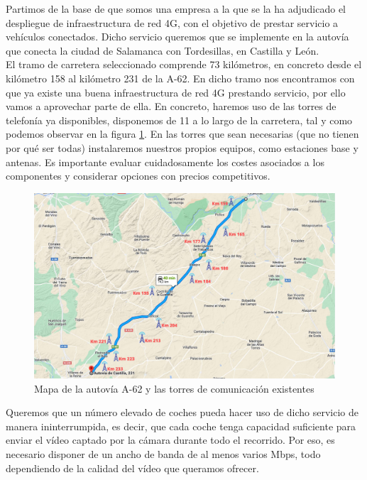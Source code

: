 Partimos de la base de que somos una empresa a la que se la ha adjudicado el despliegue de infraestructura de red 4G, con el objetivo de prestar servicio a vehículos conectados. Dicho servicio queremos que se implemente en la autovía que conecta la ciudad de Salamanca con Tordesillas, en Castilla y León. \\

El tramo de carretera seleccionado comprende 73 kilómetros, en concreto desde el kilómetro 158 al kilómetro 231 de la A-62. En dicho tramo nos encontramos con que ya existe una buena infraestructura de red 4G prestando servicio, por ello vamos a aprovechar parte de ella. En concreto, haremos uso de las torres de telefonía ya disponibles, disponemos de 11 a lo largo de la carretera, tal y como podemos observar en la figura \ref{autovia}. En las torres que sean necesarias (que no tienen por qué ser todas) instalaremos nuestros propios equipos, como estaciones base y antenas. Es importante evaluar cuidadosamente los costes asociados a los componentes y considerar opciones con precios competitivos. \\


\begin{figure}[H]
    \centering
 	\includegraphics[width=\textwidth]{Imagenes/PlanteamientoInicial/torres_telefonia.pdf}
    \caption{Mapa de la autovía A-62 y las torres de comunicación existentes }
    \label{autovia}
\end{figure}

Queremos que un número elevado de coches pueda hacer uso de dicho servicio de manera ininterrumpida, es decir, que cada coche tenga capacidad suficiente para enviar el vídeo captado por la cámara durante todo el recorrido. Por eso, es necesario disponer de un ancho de banda de al menos varios Mbps, todo dependiendo de la calidad del vídeo que queramos ofrecer. \\

